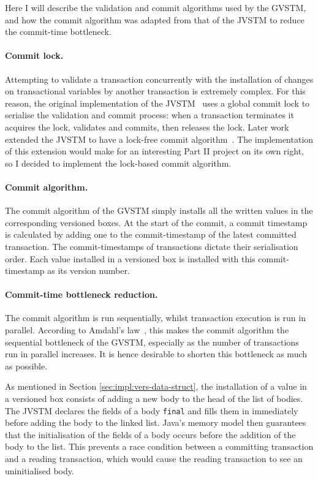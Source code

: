 \documentclass[12pt,a4paper,oneside,openright]{report}
\newcommand{\javaKeyword}[1]{\texttt{#1}}
\begin{document}
Here I will describe the validation and commit algorithms used by the
GVSTM, and how the commit algorithm was adapted from that of the JVSTM
to reduce the commit-time bottleneck.

\paragraph{Commit lock.} Attempting to validate a transaction
concurrently with the installation of changes on transactional
variables by another transaction is extremely complex. For this
reason, the original implementation of the JVSTM~\cite{VBox} uses a
global commit lock to serialise the validation and commit process:
when a transaction terminates it acquires the lock, validates and
commits, then releases the lock. Later work extended the JVSTM to have
a lock-free commit algorithm~\cite{fernandes2011lock}. The
implementation of this extension would make for an interesting Part II
project on its own right, so I decided to implement the lock-based
commit algorithm.

\paragraph{Commit algorithm.} The commit algorithm of the GVSTM simply
installs all the written values in the corresponding versioned
boxes. At the start of the commit, a commit timestamp is calculated by
adding one to the commit-timestamp of the latest committed
transaction. The commit-timestamps of transactions dictate their
serialisation order. Each value installed in a versioned box is
installed with this commit-timestamp as its version number.

\paragraph{Commit-time bottleneck reduction.} The commit algorithm is
run sequentially, whilst transaction execution is run in
parallel. According to Amdahl's law~\cite{Amdahl}, this makes the
commit algorithm the sequential bottleneck of the GVSTM, especially as
the number of transactions run in parallel increases. It is hence
desirable to shorten this bottleneck as much as possible.

As mentioned in Section \ref{sec:impl:vers-data-struct}, the
installation of a value in a versioned box consists of adding a new
body to the head of the list of bodies. The JVSTM declares the fields
of a body \javaKeyword{final} and fills them in immediately before
adding the body to the linked list. Java's memory model then
guarantees that the initialisation of the fields of a body occurs
before the addition of the body to the list. This prevents a race
condition between a committing transaction and a reading transaction,
which would cause the reading transaction to see an uninitialised
body.
\end{document}

